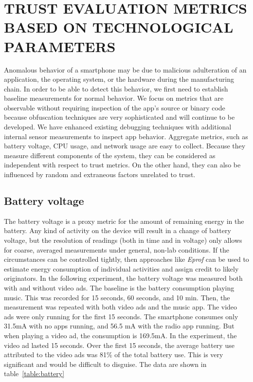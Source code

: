 \section{TRUST EVALUATION METRICS BASED ON TECHNOLOGICAL PARAMETERS}

Anomalous behavior of a smartphone may be due to malicious adulteration of an application,
the operating system, or the hardware during the manufacturing chain.
In order to be able to detect this
behavior, we first need to establish baseline measurements for 
normal behavior. We focus on metrics that are observable 
without requiring inspection of the app's source or binary code
because obfuscation techniques are very sophisticated and will continue to be developed.
We have enhanced existing debugging techniques with additional internal sensor measurements to inspect app behavior.
Aggregate metrics, such as battery voltage, CPU usage, and network usage are easy to collect.  
Because they measure different components of the system, they can be considered as independent with
respect to trust metrics.  On the other hand,
they can also be influenced by random and extraneous factors unrelated to trust.

\subsection{Battery voltage}
The battery voltage is a proxy metric for the amount of remaining 
energy in the battery. Any kind of activity on the device will result 
in a change of battery voltage, but the resolution of readings (both 
in time and in voltage) only allows for coarse, averaged measurements 
under general, non-lab conditions.
If the circumstances can be controlled tightly, then approaches like 
\textit{Eprof} \cite{pathak2012fine} can be used to estimate energy consumption 
of individual activities and assign credit to likely originators.  In the following experiment,
the battery voltage was measured both with and without video ads.
The ​baseline is the battery consumption playing  music.
This was recorded for 15 seconds, 60 seconds, and 10 min.  Then, the measurement was repeated
with both video ads and the music app.  The video ads were only running for the first 15 seconds.
The smartphone consumes only 31.5mA with no apps running, and 56.5 mA with the radio app
running.
But when playing a video ad, the consumption is 169.5mA. 
In the experiment, the video ad lasted 15 seconds.
Over the first 15 seconds, the average battery use attributed to the video ads was 81\% of the total
battery use.  This is very significant and would be difficult to disguise.
The data are shown in table~\ref{table:battery}



